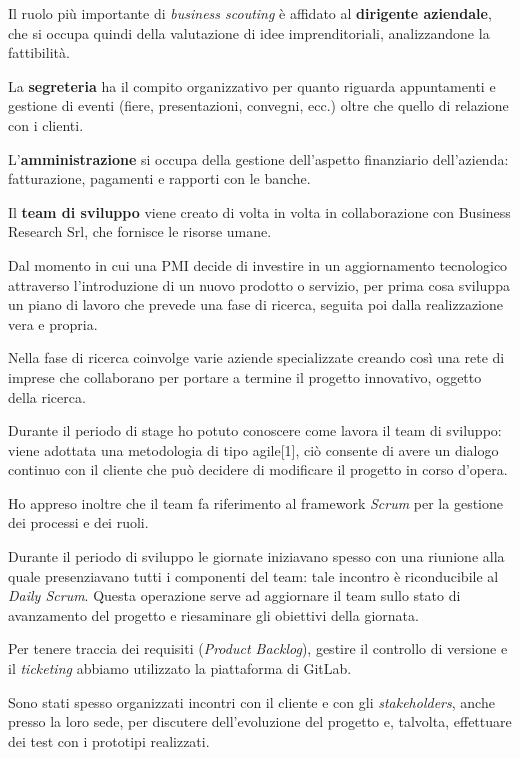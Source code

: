 Il ruolo più importante di \textit{business scouting} è affidato al \textbf{dirigente aziendale}, che si occupa quindi della valutazione di idee imprenditoriali, analizzandone la fattibilità.

La \textbf{segreteria} ha il compito organizzativo per quanto riguarda appuntamenti e gestione di eventi (fiere, presentazioni, convegni, ecc.) oltre che quello di relazione con i clienti.

L'\textbf{amministrazione} si occupa della gestione dell'aspetto finanziario dell'azienda: fatturazione, pagamenti e rapporti con le banche.

Il \textbf{team di sviluppo} viene creato di volta in volta in collaborazione con Business Research Srl, che fornisce le risorse umane.

\medskip

Dal momento in cui una PMI decide di investire in un aggiornamento tecnologico attraverso l'introduzione di un nuovo prodotto o servizio, \lab{} per prima cosa sviluppa un piano di lavoro che prevede una fase di ricerca, seguita poi dalla realizzazione vera e propria.

Nella fase di ricerca \lab{} coinvolge varie aziende specializzate creando così una rete di imprese che collaborano per portare a termine il progetto innovativo, oggetto della ricerca.

\medskip

Durante il periodo di stage ho potuto conoscere come lavora il team di sviluppo: viene adottata una metodologia di tipo agile[1], ciò consente di avere un dialogo continuo con il cliente che può decidere di modificare il progetto in corso d'opera.

Ho appreso inoltre che il team fa riferimento al framework \textit{Scrum} per la gestione dei processi e dei ruoli.

Durante il periodo di sviluppo le giornate iniziavano spesso con una riunione alla quale presenziavano tutti i componenti del team: tale incontro è riconducibile al \textit{Daily Scrum}. Questa operazione serve ad aggiornare il team sullo stato di avanzamento del progetto e riesaminare gli obiettivi della giornata.

Per tenere traccia dei requisiti (\textit{Product Backlog}), gestire il controllo di versione e il \textit{ticketing} abbiamo utilizzato la piattaforma di GitLab.

Sono stati spesso organizzati incontri con il cliente e con gli \textit{stakeholders}, anche presso la loro sede, per discutere dell'evoluzione del progetto e, talvolta, effettuare dei test con i prototipi realizzati.

